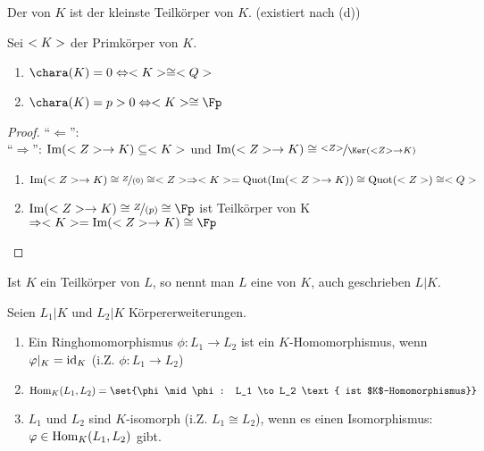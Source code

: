 \begin{definition}[Primkörper]
	Der  von $K$ ist der kleinste Teilkörper von $K$. (existiert nach (d)) %
\end{definition}

\begin{proposition}
	Sei $<K>$ der Primkörper von $K$.
	\begin{enumerate}[label=(\alph*)]
		\item $\chara(K)  = 0 \Leftrightarrow \field \cong \Q$
		\item $\chara(K)  = p > 0 \Leftrightarrow \field \cong \Fp$
	\end{enumerate}
\end{proposition}

\begin{proof}
	``$\Leftarrow$'': \\ %
	``$\Rightarrow$'': $\operatorname{Im}(<Z> \to K) \subseteq <K>$ und $\Image(\Z \to K) \cong \lnkset{\Z}{\Ker(\Z \to K)}$
	\begin{enumerate}[label=(\alph*)]
		\item $\Image(\Z \to K) \cong \lnkset{Z}{(0)} \cong \Z \Rightarrow \field = \Quot(\Image(\Z \to K)) \cong \Quot(\Z) \cong \Q$
		\item $\Image(\Z \to K) \cong \lnkset{Z}{(p)} \cong \Fp$ ist Teilkörper von K $\Rightarrow \field = \Image(\Z \to K) \cong \Fp$
	\end{enumerate}
\end{proof}

\begin{definition}[Körpererweiterung]
	Ist $K$ ein Teilkörper von $L$, so nennt man $L$ eine  von $K$, auch geschrieben $L\vert K$.
\end{definition}

\begin{definition}[$K$-Homomorphismus]
	Seien $L_1\vert K$ und $L_2 \vert K$ Körpererweiterungen.
	\begin{enumerate}
		\item Ein Ringhomomorphismus $\phi\colon L_1 \to L_2$ ist ein $K$-Homomorphismus, wenn $\varphi\vert_K = \operatorname{id}_K$ (i.Z. $\phi: L_1 \to L_2$)
		\item $\Hom_K(L_1,L_2) = \set{\phi \mid \phi: L_1 \to L_2 \text{ ist $K$-Homomorphismus}}$
		\item $L_1$ und $L_2$ sind $K$-isomorph (i.Z. $L_1 \cong L_2$), wenn es einen Isomorphismus: $\varphi \in \operatorname{Hom}_K(L_1, L_2)$ gibt.
	\end{enumerate}
\end{definition}

